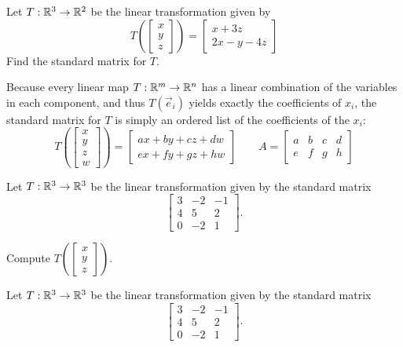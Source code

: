 \begin{applicationActivities}
\begin{activity}{5}
  Let $T: \mathbb{R}^3 \rightarrow \mathbb{R}^2$ be the linear transformation given by
$$T\left(\begin{bmatrix} x\\ y \\ z \end{bmatrix} \right) = \begin{bmatrix} x+3z \\ 2x-y-4z \end{bmatrix}$$
Find the standard matrix for \(T\).
\end{activity}

\begin{fact}
  Because every linear map \(T:\mathbb{R}^m\to\mathbb{R}^n\) has a linear combination
  of the variables in each component, and thus
  \(T(\vec e_i)\) yields exactly the coefficients of \(x_i\),
  the standard matrix for \(T\) is simply an ordered list of
  the coefficients of the \(x_i\):
  \[
    T\left(\begin{bmatrix}x\\y\\z\\w\end{bmatrix}\right)
      =
    \begin{bmatrix}
      ax+by+cz+dw \\
      ex+fy+gz+hw
    \end{bmatrix}
  \hspace{2em}
    A
      =
    \begin{bmatrix}
      a & b & c & d \\
      e & f & g & h
    \end{bmatrix}
  \]
\end{fact}

\begin{activity}{5}
  Let $T: \mathbb{R}^3 \rightarrow \mathbb{R}^3$ be the linear transformation given by the standard matrix
  \[
    \begin{bmatrix} 3  & -2 & -1  \\ 4 & 5 & 2 \\ 0 & -2 & 1 \end{bmatrix}
  .\]

Compute $T\left(\begin{bmatrix} x\\ y \\ z \end{bmatrix} \right) $.
\end{activity}

\begin{activity}{5}
  Let $T: \mathbb{R}^3 \rightarrow \mathbb{R}^3$ be the linear transformation given by the standard matrix
  \[
    \begin{bmatrix} 3  & -2 & -1  \\ 4 & 5 & 2 \\ 0 & -2 & 1 \end{bmatrix}
  .\]


\end{activity}
\end{applicationActivities}
